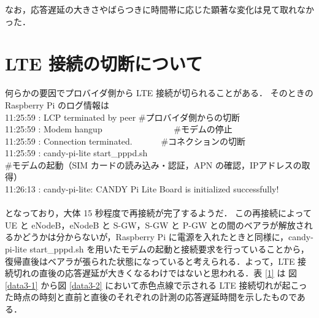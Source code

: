 \documentclass[a4j]{jarticle}
\begin{document}
なお，応答遅延の大きさやばらつきに時間帯に応じた顕著な変化は見て取れなかった．

\section{LTE 接続の切断について}
何らかの要因でプロバイダ側から LTE 接続が切られることがある．
そのときの Raspberry Pi のログ情報は
\vspace{0.5cm}\\
11:25:59 : LCP terminated by peer       \#プロバイダ側からの切断\\
11:25:59 : Modem hangup 　　　　　　　　\#モデムの停止\\
11:25:59 : Connection terminated.　　　 \#コネクションの切断\\
11:25:59 : candy-pi-lite start\_pppd.sh\\
\hspace{1cm}\#モデムの起動（SIM カードの読み込み・認証，APN の確認，IPアドレスの取得）\\
11:26:13 : candy-pi-lite: CANDY Pi Lite Board is initialized successfully!\\
\vspace{0.5cm}\\
となっており，大体 15 秒程度で再接続が完了するようだ．
この再接続によって UE と eNodeB，eNodeB と S-GW，S-GW と P-GW との間のベアラが解放されるかどうかは分からないが，Raspberry Pi に電源を入れたときと同様に，candy-pi-lite start\_pppd.sh を用いたモデムの起動と接続要求を行っていることから，復帰直後はベアラが張られた状態になっていると考えられる．よって，LTE 接続切れの直後の応答遅延が大きくなるわけではないと思われる．表 \ref{1} は 図 \ref{data3-1} から図 \ref{data3-2} において赤色点線で示される LTE 接続切れが起こった時点の時刻と直前と直後のそれぞれの計測の応答遅延時間を示したものである．
\end{document}
